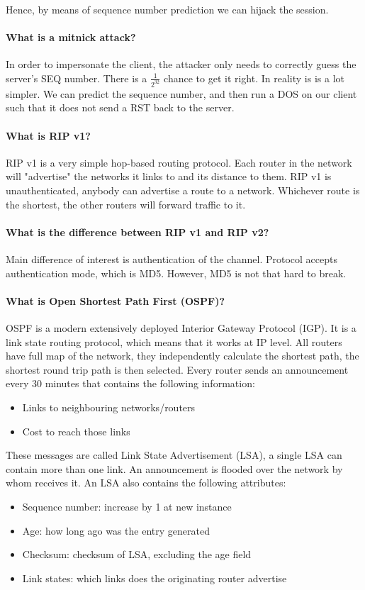 Hence, by means of sequence number prediction we can hijack the session.

\paragraph{What is a mitnick attack?}
In order to impersonate the client, the attacker only needs to correctly guess the server's SEQ number. There is a $\frac{1}{2^{32}}$ chance to get it right. In reality is is a lot simpler. We can predict the sequence number, and then run a DOS on our client such that it does not send a RST back to the server.

\paragraph{What is RIP v1?}
RIP v1 is a very simple hop-based routing protocol. Each router in the network will "advertise" the networks it links to and its distance to them. RIP v1 is unauthenticated, anybody can advertise a route to a network. Whichever route is the shortest, the other routers will forward traffic to it.

\paragraph{What is the difference between RIP v1 and RIP v2?}
Main difference of interest is authentication of the channel. Protocol accepts authentication mode, which is MD5. However, MD5 is not that hard to break.

\paragraph{What is Open Shortest Path First (OSPF)?}
OSPF is a modern extensively deployed Interior Gateway Protocol (IGP). It is a link state routing protocol, which means that it works at IP level. All routers have full map of the network, they independently calculate the shortest path, the shortest round trip path is then selected. Every router sends an announcement every 30 minutes that contains the following information:

\begin{itemize}
	\item Links to neighbouring networks/routers
	\item Cost to reach those links
\end{itemize}

These messages are called Link State Advertisement (LSA), a single LSA can contain more than one link. An announcement is flooded over the network by whom receives it. An LSA also contains the following attributes:
\begin{itemize}
	\item Sequence number: increase by 1 at new instance
	\item Age: how long ago was the entry generated
	\item Checksum: checksum of LSA, excluding the age field
	\item Link states: which links does the originating router advertise
\end{itemize}

